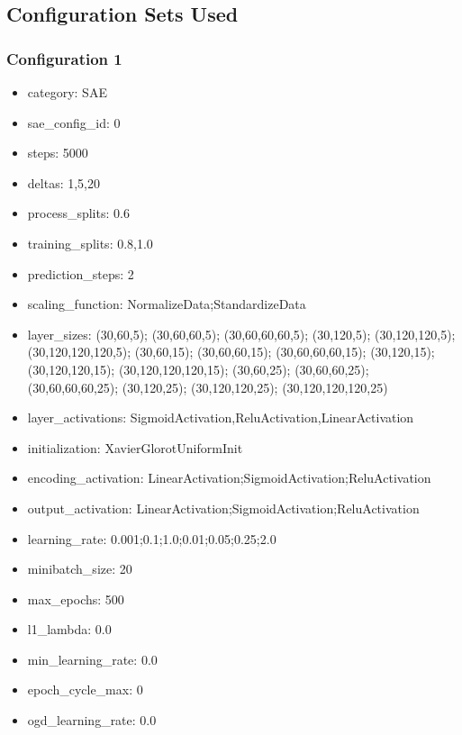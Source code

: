 \documentclass[a4paper,11pt,oneside]{article}
\theoremstyle{plain}
\theoremstyle{definition}
\begin{document}
	
	
	
	
	
	
	
	
	
	
	
	
	\newpage
	\subsection{Configuration Sets Used}
	
	\subsubsection{Configuration 1}\label{config1}
	
	\begin{itemize}
		\item category: SAE
		\item sae\_config\_id: 0
		\item steps: 5000
		\item deltas: 1,5,20
		\item process\_splits: 0.6
		\item training\_splits: 0.8,1.0
		\item prediction\_steps: 2
		\item scaling\_function: NormalizeData;StandardizeData
		\item layer\_sizes: (30,60,5); (30,60,60,5); (30,60,60,60,5); (30,120,5); (30,120,120,5); (30,120,120,120,5); (30,60,15); (30,60,60,15); (30,60,60,60,15); (30,120,15); (30,120,120,15); (30,120,120,120,15); (30,60,25); (30,60,60,25); (30,60,60,60,25); (30,120,25); (30,120,120,25); (30,120,120,120,25)
		\item layer\_activations: SigmoidActivation,ReluActivation,LinearActivation
		\item initialization: XavierGlorotUniformInit
		\item encoding\_activation: LinearActivation;SigmoidActivation;ReluActivation
		\item output\_activation: LinearActivation;SigmoidActivation;ReluActivation
		\item learning\_rate: 0.001;0.1;1.0;0.01;0.05;0.25;2.0
		\item minibatch\_size: 20
		\item max\_epochs: 500
		\item l1\_lambda: 0.0
		\item min\_learning\_rate: 0.0
		\item epoch\_cycle\_max: 0
		\item ogd\_learning\_rate: 0.0
	\end{itemize}
	
\end{document}
